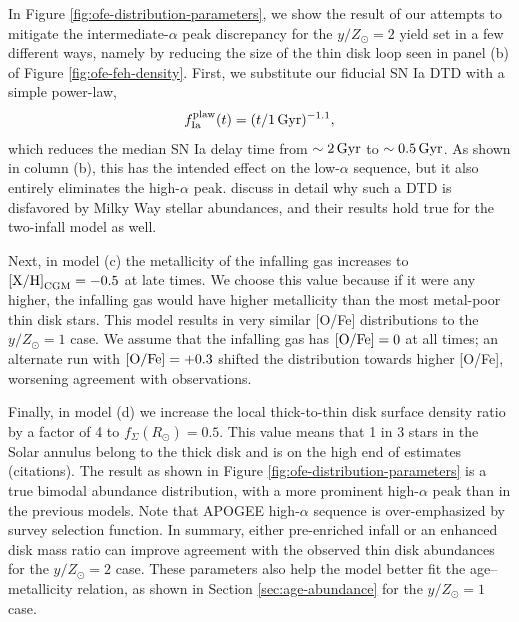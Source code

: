 \documentclass[twocolumn,twocolappendix,linenumbers]{aastex631}
\newcommand{\todo}[1]{{\color{red}#1}}
\newcommand{\mathXH}{{\rm [X/H]}}
\newcommand{\mathOFe}{{\rm [O/Fe]}}
\newcommand{\yZ}[1]{$y/Z_\odot=#1$}
\begin{document}
In Figure \ref{fig:ofe-distribution-parameters}, we show the result of our attempts to mitigate the intermediate-$\alpha$ peak discrepancy for the \yZ{2} yield set in a few different ways, namely by reducing the size of the thin disk loop seen in panel (b) of Figure \ref{fig:ofe-feh-density}. First, we substitute our fiducial SN Ia DTD with a simple power-law,
\begin{equation}
    f_{\rm Ia}^{\rm plaw}(t) = (t/1\,\rm{Gyr})^{-1.1},
    \label{eq:powerlaw-dtd}
\end{equation}
which reduces the median SN Ia delay time from $\sim2\,{\rm Gyr}$ to $\sim0.5\,{\rm Gyr}$. As shown in column (b), this has the intended effect on the low-$\alpha$ sequence, but it also entirely eliminates the high-$\alpha$ peak. \citet{dubay_galactic_2024} discuss in detail why such a DTD is disfavored by Milky Way stellar abundances, and their results hold true for the two-infall model as well.

Next, in model (c) the metallicity of the infalling gas increases to $\mathXH_{\rm CGM}=-0.5$ at late times. We choose this value because if it were any higher, the infalling gas would have higher metallicity than the most metal-poor thin disk stars. This model results in very similar [O/Fe] distributions to the $y/Z_\odot=1$ case. We assume that the infalling gas has $\mathOFe=0$ at all times; an alternate run with $\mathOFe=+0.3$ shifted the distribution towards higher [O/Fe], worsening agreement with observations. 

Finally, in model (d) we increase the local thick-to-thin disk surface density ratio by a factor of 4 to $f_\Sigma(R_\odot)=0.5$. This value means that 1 in 3 stars in the Solar annulus belong to the thick disk and is on the high end of estimates \todo{(citations)}. The result as shown in Figure \ref{fig:ofe-distribution-parameters} is a true bimodal abundance distribution, with a more prominent high-$\alpha$ peak than in the previous models. \todo{Note that APOGEE high-$\alpha$ sequence is over-emphasized by survey selection function.} In summary, either pre-enriched infall or an enhanced disk mass ratio can improve agreement with the observed thin disk abundances for the \yZ{2} case. These parameters also help the model better fit the age--metallicity relation, as shown in Section \ref{sec:age-abundance} for the \yZ{1} case.
\end{document}
